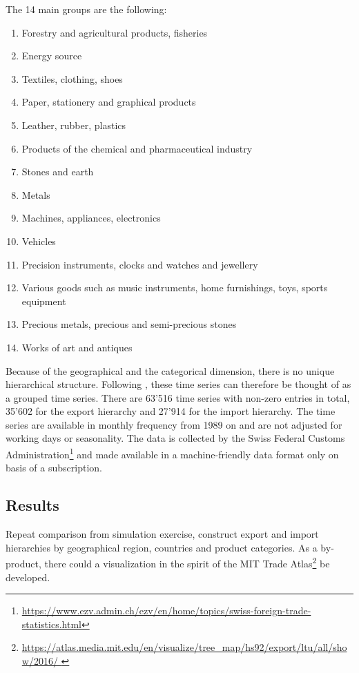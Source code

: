 \documentclass[a4paper,fleqn,11pt]{article}
\begin{document}
 The 14 main groups are the following:
\begin{enumerate}[itemsep=-1ex,partopsep=1ex,parsep=1ex]
    \item Forestry and agricultural products, fisheries
    \item Energy source
    \item Textiles, clothing, shoes
    \item Paper, stationery and graphical products
    \item Leather, rubber, plastics 
    \item Products of the chemical and pharmaceutical industry
    \item Stones and earth
    \item Metals
    \item Machines, appliances, electronics
    \item Vehicles
    \item Precision instruments, clocks and watches and jewellery  
    \item Various goods such as music instruments, home furnishings, toys, sports equipment
    \item Precious metals, precious and semi-precious stones
    \item Works of art and antiques
\end{enumerate}
Because of the geographical and the categorical dimension, there is no unique hierarchical structure. Following \cite{Hyndman2016}, these time series can therefore be thought of as a grouped time series. There are 63'516 time series with non-zero entries in total, 35'602 for the export hierarchy and 27'914 for the import hierarchy. The time series are available in monthly frequency from 1989 on and are not adjusted for working days or seasonality. The data is collected by the Swiss Federal Customs Administration\footnote{\url{https://www.ezv.admin.ch/ezv/en/home/topics/swiss-foreign-trade-statistics.html}} and made available in a machine-friendly data format only on basis of a subscription.\\


\subsection{Results}
Repeat comparison from simulation exercise, construct export and import hierarchies by geographical region, countries and product categories. As a by-product, there could a visualization in the spirit of the MIT Trade Atlas\footnote{\url{https://atlas.media.mit.edu/en/visualize/tree_map/hs92/export/ltu/all/show/2016/ }} be developed.\\
\end{document}
